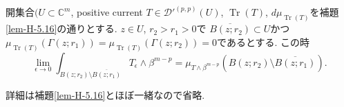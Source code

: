 \begin{tcolorbox}[mybox]
\begin{lem}
\label{lem-H-5.18}
開集合$(U\subset\mathbb{C}^m$, positive current $T\in\mathcal{D}'^{(p,p)}(U)$, 
$\operatorname{Tr}(T)$, $d\mu_{\operatorname{Tr}(T)}$を補題\ref{lem-H-5.16}の通りとする. 
$z\in U$, $r_2>r_1>0$で
$\overline{B(z;r_2)}\subset U$かつ
$\mu_{\operatorname{Tr}(T)}(\Gamma(z;r_1))
=
\mu_{\operatorname{Tr}(T)}(\Gamma(z;r_2))
=
0$であるとする. 
この時
\begin{equation*}
\lim_{\epsilon\to0}
\int_{B(z;r_2)\setminus\overline{B(z;r_1)}}
T_\epsilon\wedge\beta^{m-p}
=
\mu_{T\wedge\beta^{m-p}}
\left(
B(z;r_2)\setminus\overline{B(z;r_1)}
\right).
\end{equation*}
\end{lem}
\end{tcolorbox}
詳細は補題\ref{lem-H-5.16}とほぼ一緒なので省略.
